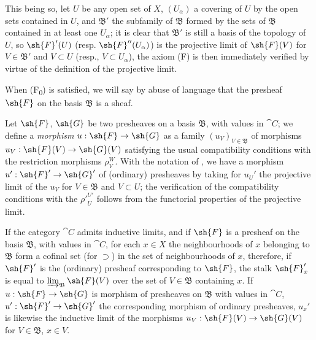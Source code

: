 \begin{env}[3.2.2]
This being so, let $U$ be any open set of $X$, $(U_\alpha)$ a covering of $U$ by
the open sets contained in $U$, and $\mathfrak{B}'$ the subfamily of
$\mathfrak{B}$ formed by the sets
of $\mathfrak{B}$ contained in at least one $U_\alpha$; it is clear that
$\mathfrak{B}'$ is still a basis of the topology of $U$, so $\sh{F}'(U)$
(resp. $\sh{F}''(U_\alpha)$) is the projective limit of $\sh{F}(V)$ for
$V\in\mathfrak{B}'$ and $V\subset U$ (resp., $V\subset U_\alpha$), the axiom (F)
is then immediately verified by virtue of the definition of the projective
limit.

When (F\textsubscript{0}) is satisfied, we will say by abuse of language that the presheaf
$\sh{F}$ on the basis $\mathfrak{B}$ is a sheaf.
\end{env}

\begin{env}[3.2.3]
\label{0.3.2.3}
Let $\sh{F}$, $\sh{G}$ be two presheaves on a basis $\mathfrak{B}$, with values
in $\cat{C}$; we define a \emph{morphism} $u:\sh{F}\to\sh{G}$ as a family
$(u_V)_{V\in\mathfrak{B}}$ of morphisms $u_V:\sh{F}(V)\to\sh{G}(V)$ satisfying
the usual compatibility conditions with the restriction morphisms $\rho_V^W$.
With the notation of , we have a morphism
$u':\sh{F}'\to\sh{G}'$ of (ordinary) presheaves by taking for $u_U'$ the
projective limit of the $u_V$ for $V\in\mathfrak{B}$ and $V\subset U$; the
verification of the compatibility conditions with the ${\rho'}_U^{U'}$ follows
from the functorial properties of the projective limit.
\end{env}

\begin{env}[3.2.4]
\label{0.3.2.4}
If the category $\cat{C}$ admits inductive limits, and if $\sh{F}$ is a presheaf on
the basis $\mathfrak{B}$, with values in $\cat{C}$, for each $x\in X$ the
neighbourhoods of $x$ belonging to $\mathfrak{B}$ form a cofinal set
(for $\supset$) in the set of neighbourhoods of $x$, therefore, if $\sh{F}'$ is
the (ordinary) presheaf corresponding to $\sh{F}$, the stalk $\sh{F}_x'$ is
equal to $\varinjlim_{\mathfrak{B}}\sh{F}(V)$ over the set of $V\in\mathfrak{B}$
containing $x$. If $u:\sh{F}\to\sh{G}$ is morphism of presheaves on
$\mathfrak{B}$ with values in $\cat{C}$, $u':\sh{F}'\to\sh{G}'$ the corresponding
morphism of ordinary presheaves, $u_x'$ is likewise the inductive limit of the
morphisms $u_V:\sh{F}(V)\to\sh{G}(V)$ for $V\in\mathfrak{B}$, $x\in V$.
\end{env}

